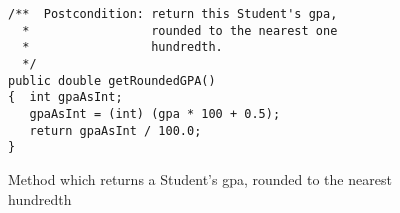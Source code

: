 




\begin {figure}

\begin {verbatim}
/**  Postcondition: return this Student's gpa,
  *                 rounded to the nearest one 
  *                 hundredth.
  */
public double getRoundedGPA()
{  int gpaAsInt;
   gpaAsInt = (int) (gpa * 100 + 0.5);
   return gpaAsInt / 100.0;
}
\end{verbatim}




\caption {Method which returns a Student's gpa,
rounded to the nearest hundredth}
\label {fig:roundedGPA}

\end {figure}


